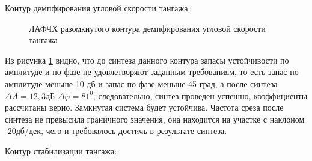 
\begin{center}
    Контур демпфирования угловой скорости тангажа:
\end{center}

\begin{figure}[H]
    \caption{ЛАФЧХ разомкнутого контура демпфирования угловой скорости тангажа}
    \label{fig:Угловая скорость тангажа раз qKR}
\end{figure}

Из рисунка \ref{fig:Угловая скорость тангажа раз qKR} видно, что до синтеза данного контура запасы устойчивости по амплитуде и по фазе не удовлетворяют заданным требованиям, то есть запас по амплитуде меньше 10 дб и запас по фазе меньше 45 град, а после синтеза $\Delta A = 12,3 $дБ $\Delta \varphi = 81^0$, следовательно, синтез проведен успешно, коэффициенты рассчитаны верно. Замкнутая система будет устойчива. Частота среза после синтеза не превысила граничного значения, она находится на участке с наклоном -20дб/дек, чего и требовалось достичь в результате синтеза.  

\begin{center}
    Контур стабилизации тангажа:
\end{center}

